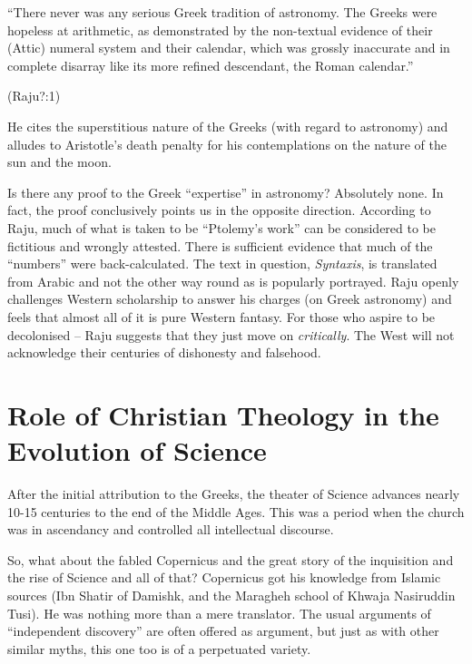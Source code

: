 \begin{myquote}
“There never was any serious Greek tradition of astronomy. The Greeks were hopeless at arithmetic, as demonstrated by the non-textual evidence of their (Attic) numeral system and their calendar, which was grossly inaccurate and in complete disarray like its more refined descendant, the Roman calendar.”
\end{myquote}

\hfill (Raju?:1)

He cites the superstitious nature of the Greeks (with regard to astronomy) and alludes to Aristotle’s death penalty for his contemplations on the nature of the sun and the moon.

Is there any proof to the Greek “expertise” in astronomy? Absolutely none. In fact, the proof conclusively points us in the opposite direction. According to Raju, much of what is taken to be “Ptolemy’s work” can be considered to be fictitious and wrongly attested. There is sufficient evidence that much of the “numbers” were back-calculated. The text in question, \textit{Syntaxis}, is translated from Arabic and not the other way round as is popularly portrayed. Raju openly challenges Western scholarship to answer his charges (on Greek astronomy) and feels that almost all of it is pure Western fantasy. For those who aspire to be decolonised – Raju suggests that they just move on \textit{critically}. The West will not acknowledge their centuries of dishonesty and falsehood.


\section*{Role of Christian Theology in the Evolution of Science}

After the initial attribution to the Greeks, the theater of Science advances nearly 10-15 centuries to the end of the Middle Ages. This was a period when the church was in ascendancy and controlled all intellectual discourse.

So, what about the fabled Copernicus and the great story of the inquisition and the rise of Science and all of that? Copernicus got his knowledge from Islamic sources (Ibn Shatir of Damishk, and the Maragheh school of Khwaja Nasiruddin Tusi). He was nothing more than a mere translator. The usual arguments of “independent discovery” are often offered as argument, but just as with other similar myths, this one too is of a perpetuated variety.

